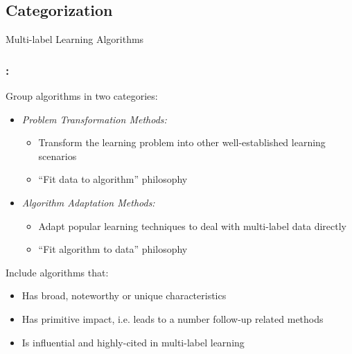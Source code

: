 \documentclass{beamer}
\begin{document}
\subsection{Categorization}
\begin{frame}
\Huge{\centerline{Multi-label Learning Algorithms}}
\end{frame}
\begin{frame}
\frametitle{\insertsection : \insertsubsection}

Group algorithms in two categories:
\begin{itemize}
\item \emph{Problem Transformation Methods:}

\begin{itemize}
\item Transform the learning problem into other well-established learning scenarios
\item ``Fit data to algorithm'' philosophy
\end{itemize}

\item \emph{Algorithm Adaptation Methods:}
\begin{itemize}
\item Adapt popular learning techniques to deal with multi-label data directly
\item ``Fit algorithm to data'' philosophy
\end{itemize}
\end{itemize}

Include algorithms that:
\begin{itemize}
\item Has broad, noteworthy or unique characteristics
\item Has primitive impact, i.e. leads to a number follow-up related methods
\item Is influential and highly-cited in multi-label learning
\end{itemize}

\end{frame}
\end{document}
